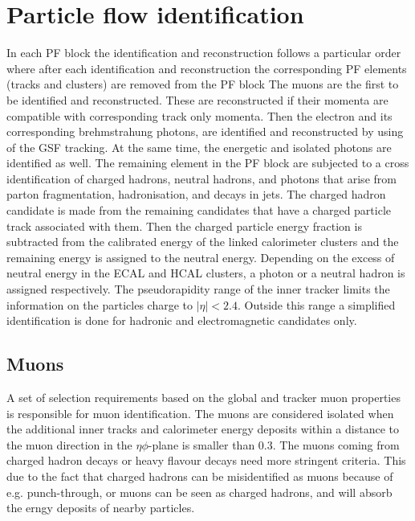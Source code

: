 \section{Particle flow identification}
In each PF block the identification and reconstruction follows a particular order where after each identification and reconstruction the corresponding PF elements (tracks and clusters) are removed from the PF block The muons are the first to be identified and reconstructed. These are reconstructed if their momenta are compatible with corresponding track only momenta. Then the electron and its corresponding brehmstrahung photons, are identified and reconstructed by using of the GSF tracking. At the same time, the energetic and isolated photons are identified as well. The remaining element in the PF block are subjected to a cross identification of charged hadrons, neutral hadrons, and photons that arise from parton fragmentation, hadronisation, and decays in jets. The charged hadron candidate is made from the remaining candidates that have a charged particle track associated with them. Then the charged particle energy fraction is subtracted from the calibrated energy of the linked calorimeter clusters and the remaining energy is assigned to the neutral energy. Depending on the excess of neutral energy in the ECAL and HCAL clusters, a photon or a neutral hadron is assigned respectively. The pseudorapidity range of the inner tracker limits the information on the particles charge to $|\eta| < 2.4$. Outside this range a simplified identification is done for hadronic and electromagnetic candidates only. 

\subsection{Muons}
\label{sec:Muon}
A set of selection requirements based on the global and tracker muon properties is responsible for muon identification. The muons are considered isolated when the additional inner tracks and calorimeter energy deposits within a distance to the muon direction in the $\eta\phi$-plane is smaller than 0.3. The muons coming from charged hadron decays or heavy flavour decays need more stringent criteria. This due to the fact that charged hadrons can be misidentified as muons because of e.g. punch-through, or muons can be seen as charged hadrons, and will absorb the erngy deposits of nearby particles. 
